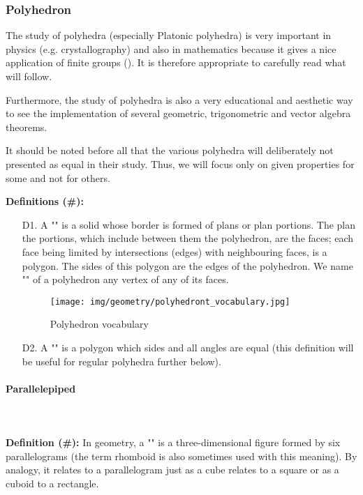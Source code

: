 {	\pagebreak
	\subsubsection{Polyhedron}
	The study of polyhedra (especially Platonic polyhedra) is very important in physics (e.g. crystallography) and also in mathematics because it gives a nice application of finite groups (). It is therefore appropriate to carefully read what will follow.
	
	Furthermore, the study of polyhedra is also a very educational and aesthetic way to see the implementation of several geometric, trigonometric and vector algebra theorems.
	
	It should be noted before all that the various polyhedra will deliberately not presented as equal in their study. Thus, we will focus only on given properties for some and not for others.
	
	\textbf{Definitions (\#\mydef):}
	\begin{enumerate}
		\item[D1.] A "" is a solid whose border is formed of plans or plan portions. The plan the portions, which include between them the polyhedron, are the faces; each face being limited by intersections (edges) with neighbouring faces, is a polygon. The sides of this polygon are the edges of the polyhedron. We name "" of a polyhedron any vertex of any of its faces.
		\begin{figure}[H]
			\centering
			\texttt{[image: img/geometry/polyhedront\_vocabulary.jpg]}
			\caption{Polyhedron vocabulary}
		\end{figure}
		
		\item[D2.] A "" is a polygon which sides and all angles are equal (this definition will be useful for regular polyhedra further below).
	\end{enumerate}
	
	\paragraph{Parallelepiped}\mbox{}\\\\
	\textbf{Definition (\#\mydef):} In geometry, a "" is a three-dimensional figure formed by six parallelograms (the term rhomboid is also sometimes used with this meaning). By analogy, it relates to a parallelogram just as a cube relates to a square or as a cuboid to a rectangle.
	
}
